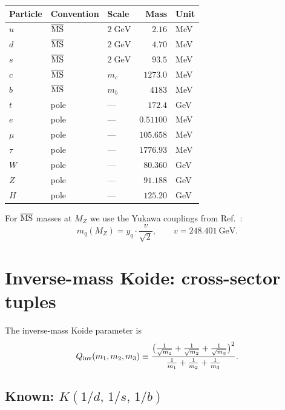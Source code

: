 \documentclass[11pt]{article}
\begin{document}
\begin{center}
\small
\begin{tabular}{@{}l l l r l@{}}
\toprule
Particle & Convention & Scale & Mass & Unit \\
\midrule
$u$ & $\overline{\rm MS}$ & $2\;\text{GeV}$ & $2.16$ & MeV \\
$d$ & $\overline{\rm MS}$ & $2\;\text{GeV}$ & $4.70$ & MeV \\
$s$ & $\overline{\rm MS}$ & $2\;\text{GeV}$ & $93.5$ & MeV \\
$c$ & $\overline{\rm MS}$ & $m_c$ & $1273.0$ & MeV \\
$b$ & $\overline{\rm MS}$ & $m_b$ & $4183$ & MeV \\
$t$ & pole & --- & $172.4$ & GeV \\
$e$ & pole & --- & $0.51100$ & MeV \\
$\mu$ & pole & --- & $105.658$ & MeV \\
$\tau$ & pole & --- & $1776.93$ & MeV \\
$W$ & pole & --- & $80.360$ & GeV \\
$Z$ & pole & --- & $91.188$ & GeV \\
$H$ & pole & --- & $125.20$ & GeV \\
\bottomrule
\end{tabular}
\end{center}

For $\overline{\rm MS}$ masses at $M_Z$ we use the Yukawa
couplings from Ref.~\cite{AHS2025}:
\begin{equation}
  m_q(M_Z) = y_q \cdot \frac{v}{\sqrt{2}},
  \qquad v = 248.401~\text{GeV}.
\end{equation}

\section{Inverse-mass Koide: cross-sector tuples}

The inverse-mass Koide parameter is
\begin{equation}
  Q_{\rm inv}(m_1,m_2,m_3) \equiv
  \frac{\bigl(\frac{1}{\sqrt{m_1}}+\frac{1}{\sqrt{m_2}}
    +\frac{1}{\sqrt{m_3}}\bigr)^2}
  {\frac{1}{m_1}+\frac{1}{m_2}+\frac{1}{m_3}}.
\end{equation}

\subsection{Known: $K(1/d,\,1/s,\,1/b)$}
\end{document}
